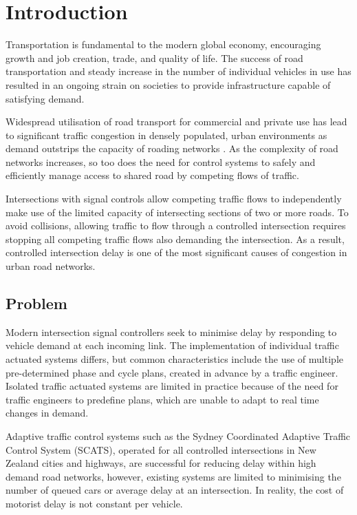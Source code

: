 \chapter{Introduction}

Transportation is fundamental to the modern global economy, encouraging growth and job creation, trade, and quality of life. The success of road transportation and steady increase in the number of individual vehicles in use has resulted in an ongoing strain on societies to provide infrastructure capable of satisfying demand. 

Widespread utilisation of road transport for commercial and private use has lead to significant traffic congestion in densely populated, urban environments as demand outstrips the capacity of roading networks \cite{euro2011whitepaper}. As the complexity of road networks increases, so too does the need for control systems to safely and efficiently manage access to shared road by competing flows of traffic. 

Intersections with signal controls allow competing traffic flows to independently make use of the limited capacity of intersecting sections of  two or more roads. To avoid collisions, allowing traffic to flow through a controlled intersection requires stopping all competing traffic flows also demanding the intersection. As a result, controlled intersection delay is one of the most significant causes of congestion in urban road networks.

\section{Problem}

Modern intersection signal controllers seek to minimise delay by responding to vehicle demand at each incoming link. The implementation of individual traffic actuated systems differs, but common characteristics include the use of multiple pre-determined phase and cycle plans, created in advance by a traffic engineer. Isolated traffic actuated systems are limited in practice because of the need for traffic engineers to predefine plans, which are unable to adapt to real time changes in demand. 

Adaptive traffic control systems such as the Sydney Coordinated Adaptive Traffic Control System (SCATS), operated for all controlled intersections in New Zealand cities and highways, are successful for reducing delay within high demand road networks, however, existing systems are limited to minimising the number of queued cars or average delay at an intersection. In reality, the cost of motorist delay is not constant per vehicle.  

